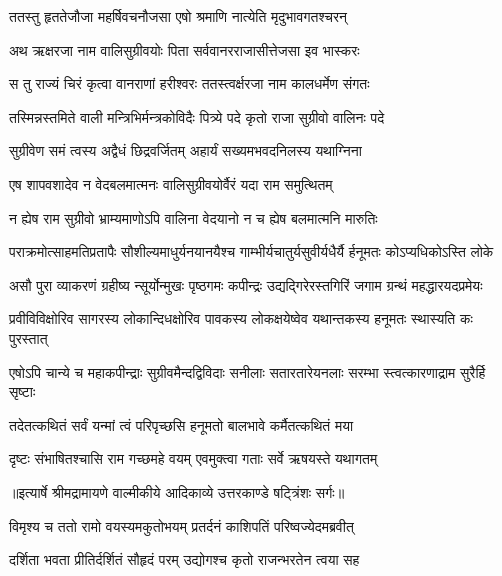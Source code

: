 \twolineshloka
{ततस्तु हृततेजौजा महर्षिवचनौजसा}
{एषो श्रमाणि नात्येति मृदुभावगतश्चरन्} %

\twolineshloka
{अथ ऋक्षरजा नाम वालिसुग्रीवयोः पिता}
{सर्ववानरराजासीत्तेजसा इव भास्करः} %

\twolineshloka
{स तु राज्यं चिरं कृत्वा वानराणां हरीश्वरः}
{ततस्त्वर्क्षरजा नाम कालधर्मेण संगतः} %

\twolineshloka
{तस्मिन्नस्तमिते वाली मन्त्रिभिर्मन्त्रकोविदैः}
{पित्र्ये पदे कृतो राजा सुग्रीवो वालिनः पदे} %

\twolineshloka
{सुग्रीवेण समं त्वस्य अद्वैधं छिद्रवर्जितम्}
{अहार्यं सख्यमभवदनिलस्य यथाग्निना} %

\twolineshloka
{एष शापवशादेव न वेदबलमात्मनः}
{वालिसुग्रीवयोर्वैरं यदा राम समुत्थितम्} %

\twolineshloka
{न ह्येष राम सुग्रीवो भ्राम्यमाणोऽपि वालिना}
{वेदयानो न च ह्येष बलमात्मनि मारुतिः} %

\fourlineindentedshloka
{पराक्रमोत्साहमतिप्रतापैः}
{ सौशील्यमाधुर्यनयानयैश्च}
{गाम्भीर्यचातुर्यसुवीर्यधैर्यै}
{र्हनूमतः कोऽप्यधिकोऽस्ति लोके} %

\fourlineindentedshloka
{असौ पुरा व्याकरणं ग्रहीष्य}
{न्सूर्योन्मुखः पृष्ठगमः कपीन्द्रः}
{उद्यद्गिरेरस्तगिरिं जगाम}
{ ग्रन्थं महद्धारयदप्रमेयः} %

\fourlineindentedshloka
{प्रवीविविक्षोरिव सागरस्य}
{ लोकान्दिधक्षोरिव पावकस्य}
{लोकक्षयेष्वेव यथान्तकस्य}
{ हनूमतः स्थास्यति कः पुरस्तात्} %

\fourlineindentedshloka
{एषोऽपि चान्ये च महाकपीन्द्राः}
{ सुग्रीवमैन्दद्विविदाः सनीलाः}
{सतारतारेयनलाः सरम्भा}
{स्त्वत्कारणाद्राम सुरैर्हि सृष्टाः} %

\twolineshloka
{तदेतत्कथितं सर्वं यन्मां त्वं परिपृच्छसि}
{हनूमतो बालभावे कर्मैतत्कथितं मया} %

\twolineshloka
{दृष्टः संभाषितश्चासि राम गच्छमहे वयम्}
{एवमुक्त्वा गताः सर्वे ऋषयस्ते यथागतम्} %


{॥इत्यार्षे श्रीमद्रामायणे वाल्मीकीये आदिकाव्ये उत्तरकाण्डे षट्त्रिंशः सर्गः॥}


\twolineshloka
{विमृश्य च ततो रामो वयस्यमकुतोभयम्}
{प्रतर्दनं काशिपतिं परिष्वज्येदमब्रवीत्} %

\twolineshloka
{दर्शिता भवता प्रीतिर्दर्शितं सौहृदं परम्}
{उद्योगश्च कृतो राजन्भरतेन त्वया सह} %

